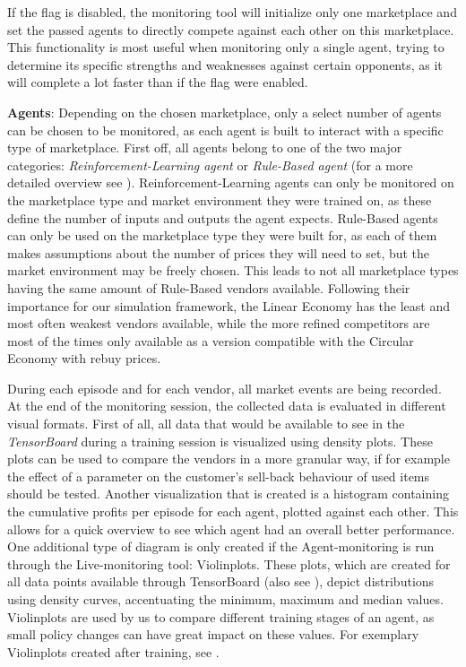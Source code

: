 If the flag is disabled, the monitoring tool will initialize only one marketplace and set the passed agents to directly compete against each other on this marketplace. This functionality is most useful when monitoring only a single agent, trying to determine its specific strengths and weaknesses against certain opponents, as it will complete a lot faster than if the flag were enabled.

\medskip
\noindent\textbf{Agents}: Depending on the chosen marketplace, only a select number of agents can be chosen to be monitored, as each agent is built to interact with a specific type of marketplace. First off, all agents belong to one of the two major categories: \emph{Reinforcement-Learning agent} or \emph{Rule-Based agent} (for a more detailed overview see ). Reinforcement-Learning agents can only be monitored on the marketplace type and market environment they were trained on, as these define the number of inputs and outputs the agent expects. Rule-Based agents can only be used on the marketplace type they were built for, as each of them makes assumptions about the number of prices they will need to set, but the market environment may be freely chosen. This leads to not all marketplace types having the same amount of Rule-Based vendors available. Following their importance for our simulation framework, the Linear Economy has the least and most often weakest vendors available, while the more refined competitors are most of the times only available as a version compatible with the Circular Economy with rebuy prices.

\medskip
During each episode and for each vendor, all market events are being recorded. At the end of the monitoring session, the collected data is evaluated in different visual formats. First of all, all data that would be available to see in the \emph{TensorBoard} during a training session is visualized using density plots. These plots can be used to compare the vendors in a more granular way, if for example the effect of a parameter on the customer's sell-back behaviour of used items should be tested. Another visualization that is created is a histogram containing the cumulative profits per episode for each agent, plotted against each other. This allows for a quick overview to see which agent had an overall better performance. One additional type of diagram is only created if the Agent-monitoring is run through the Live-monitoring tool: Violinplots. These plots, which are created for all data points available through TensorBoard (also see ), depict distributions using density curves, accentuating the minimum, maximum and median values. Violinplots are used by us to compare different training stages of an agent, as small policy changes can have great impact on these values. For exemplary Violinplots created after training, see .

